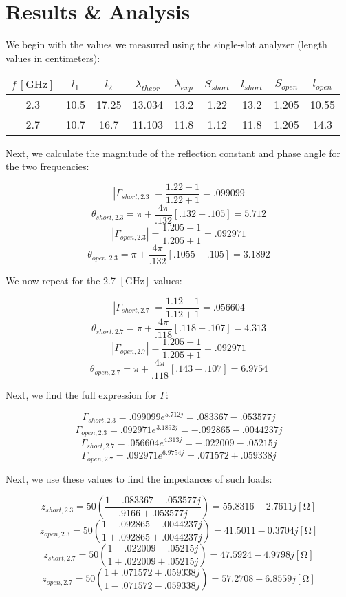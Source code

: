 \documentclass[
	letterpaper, %
	10pt, %
]{CSUniSchoolLabReport}
\begin{document}
\section{Results \& Analysis} 

We begin with the values we measured using the single-slot analyzer (length values in centimeters):

\begin{center}
\begin{tabular}[h!]{|c|c|c|c|c|c|c|c|c|}
  \hline
  $f\,[\si{\giga\hertz}]$ & $l_1$ & $l_2$ & $\lambda_{theor}$ & $\lambda_{exp}$ & $S_{short}$ & $l_{short}$ & $S_{open}$ & $l_{open}$\\
  \hline
  2.3 & 10.5 & 17.25 & 13.034 & 13.2 & 1.22 & 13.2 & 1.205 & 10.55\\
  \hline
  2.7 & 10.7 & 16.7 & 11.103 & 11.8 & 1.12 & 11.8 & 1.205 & 14.3\\
  \hline
\end{tabular}
\end{center}

Next, we calculate the magnitude of the reflection constant and phase angle for the two frequencies:

$$|\Gamma_{short,2.3}|=\frac{1.22-1}{1.22+1}=.099099$$
$$\theta_{short,2.3}=\pi+\frac{4\pi}{.132}\left[ .132-.105 \right]=5.712$$
$$|\Gamma_{open,2.3}|=\frac{1.205-1}{1.205+1}=.092971$$
$$\theta_{open,2.3}=\pi+\frac{4\pi}{.132}\left[ .1055-.105 \right]=3.1892$$

We now repeat for the 2.7 $[\si{\giga\hertz}]$ values:

$$|\Gamma_{short,2.7}|=\frac{1.12-1}{1.12+1}=.056604$$
$$\theta_{short,2.7}=\pi+\frac{4\pi}{.118}\left[ .118-.107\right]=4.313$$
$$|\Gamma_{open,2.7}|=\frac{1.205-1}{1.205+1}=.092971$$
$$\theta_{open,2.7}=\pi+\frac{4\pi}{.118}\left[ .143-.107 \right]=6.9754$$

Next, we find the full expression for $\Gamma$:

$$\Gamma_{short,2.3}=.099099e^{5.712j}=.083367-.053577j$$
$$\Gamma_{open,2.3}=.092971e^{3.1892j}=-.092865-.0044237j$$
$$\Gamma_{short,2.7}=.056604e^{4.313j}=-.022009-.05215j$$
$$\Gamma_{open,2.7}=.092971e^{6.9754j}=.071572+.059338j$$

Next, we use these values to find the impedances of such loads:

$$z_{short,2.3}=50\left( \frac{1+.083367-.053577j}{.9166+.053577j} \right)=55.8316-2.7611j[\si{\ohm}]$$
$$z_{open,2.3}=50\left(\frac{1-.092865-.0044237j}{1+.092865+.0044237j}\right)=41.5011-0.3704j[\si{\ohm}]$$
$$z_{short,2.7}=50\left( \frac{1-.022009-.05215j}{1+.022009+.05215j} \right)=47.5924-4.9798j[\si{\ohm}]$$
$$z_{open,2.7}=50\left( \frac{1+.071572+.059338j}{1-.071572-.059338j} \right)=57.2708+6.8559j[\si{\ohm}]$$
\end{document}

